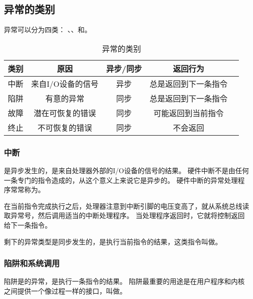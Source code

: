 {    \subsection{异常的类别}
    {
        异常可以分为四类：
        、、和。

        \begin{table}[htb]
            \centering

            \caption{异常的类别}

            \begin{tabular}{|c|c|c|c|c}
                \hline
                类别 & 原因 & 异步/同步 & 返回行为 \\
                \hline
                中断 & 来自I/O设备的信号 & 异步 & 总是返回到下一条指令 \\
                \hline
                陷阱 & 有意的异常 & 同步 & 总是返回到下一条指令 \\
                \hline
                故障 & 潜在可恢复的错误 & 同步 & 可能返回到当前指令 \\
                \hline
                终止 & 不可恢复的错误 & 同步 & 不会返回 \\
                \hline
            \end{tabular}
        \end{table}

        \subsubsection{中断}
        {
            是异步发生的，是来自处理器外部的I/O设备的信号的结果。
            硬件中断不是由任何一条专门的指令造成的，从这个意义上来说它是异步的。
            硬件中断的异常处理程序常常称为。

            在当前指令完成执行之后，处理器注意到中断引脚的电压变高了，就从系统总线读取异常号，然后调用适当的中断处理程序。
            当处理程序返回时，它就将控制返回给下一条指令。

            剩下的异常类型是同步发生的，是执行当前指令的结果，这类指令叫做。
        }

        \subsubsection{陷阱和系统调用}
        {
            陷阱是的异常，是执行一条指令的结果。
            陷阱最重要的用途是在用户程序和内核之间提供一个像过程一样的接口，叫做。
        }

}}

